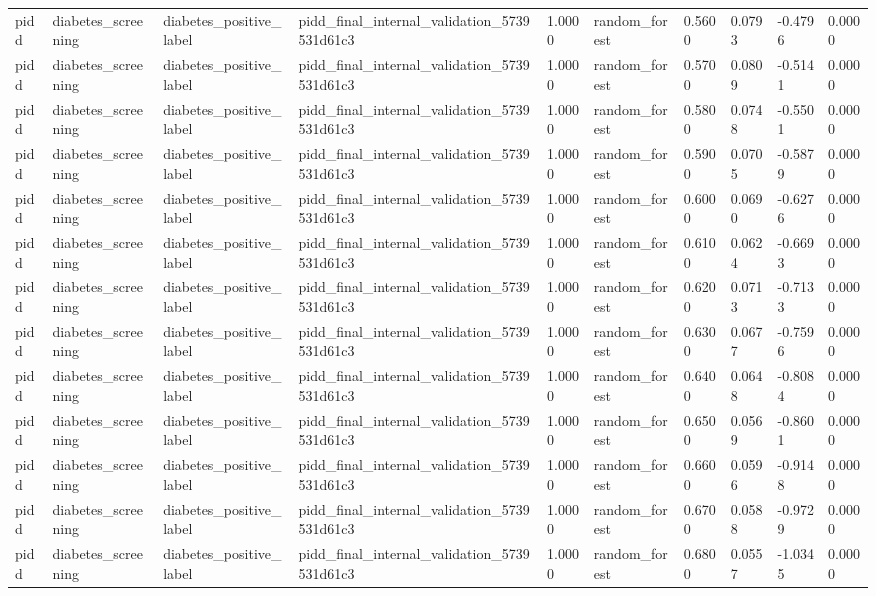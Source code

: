 \begin{tabular}{llllllllll}
pidd & diabetes\_screening & diabetes\_positive\_label & pidd\_final\_internal\_validation\_5739531d61c3 & 1.0000 & random\_forest & 0.5600 & 0.0793 & -0.4796 & 0.0000 \\
pidd & diabetes\_screening & diabetes\_positive\_label & pidd\_final\_internal\_validation\_5739531d61c3 & 1.0000 & random\_forest & 0.5700 & 0.0809 & -0.5141 & 0.0000 \\
pidd & diabetes\_screening & diabetes\_positive\_label & pidd\_final\_internal\_validation\_5739531d61c3 & 1.0000 & random\_forest & 0.5800 & 0.0748 & -0.5501 & 0.0000 \\
pidd & diabetes\_screening & diabetes\_positive\_label & pidd\_final\_internal\_validation\_5739531d61c3 & 1.0000 & random\_forest & 0.5900 & 0.0705 & -0.5879 & 0.0000 \\
pidd & diabetes\_screening & diabetes\_positive\_label & pidd\_final\_internal\_validation\_5739531d61c3 & 1.0000 & random\_forest & 0.6000 & 0.0690 & -0.6276 & 0.0000 \\
pidd & diabetes\_screening & diabetes\_positive\_label & pidd\_final\_internal\_validation\_5739531d61c3 & 1.0000 & random\_forest & 0.6100 & 0.0624 & -0.6693 & 0.0000 \\
pidd & diabetes\_screening & diabetes\_positive\_label & pidd\_final\_internal\_validation\_5739531d61c3 & 1.0000 & random\_forest & 0.6200 & 0.0713 & -0.7133 & 0.0000 \\
pidd & diabetes\_screening & diabetes\_positive\_label & pidd\_final\_internal\_validation\_5739531d61c3 & 1.0000 & random\_forest & 0.6300 & 0.0677 & -0.7596 & 0.0000 \\
pidd & diabetes\_screening & diabetes\_positive\_label & pidd\_final\_internal\_validation\_5739531d61c3 & 1.0000 & random\_forest & 0.6400 & 0.0648 & -0.8084 & 0.0000 \\
pidd & diabetes\_screening & diabetes\_positive\_label & pidd\_final\_internal\_validation\_5739531d61c3 & 1.0000 & random\_forest & 0.6500 & 0.0569 & -0.8601 & 0.0000 \\
pidd & diabetes\_screening & diabetes\_positive\_label & pidd\_final\_internal\_validation\_5739531d61c3 & 1.0000 & random\_forest & 0.6600 & 0.0596 & -0.9148 & 0.0000 \\
pidd & diabetes\_screening & diabetes\_positive\_label & pidd\_final\_internal\_validation\_5739531d61c3 & 1.0000 & random\_forest & 0.6700 & 0.0588 & -0.9729 & 0.0000 \\
pidd & diabetes\_screening & diabetes\_positive\_label & pidd\_final\_internal\_validation\_5739531d61c3 & 1.0000 & random\_forest & 0.6800 & 0.0557 & -1.0345 & 0.0000 \\

\end{tabular}
